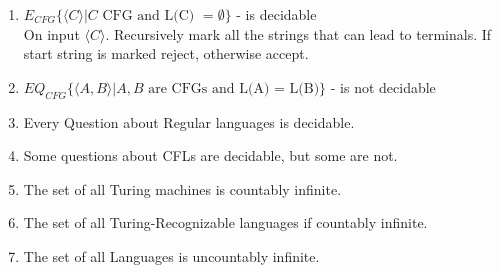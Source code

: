 \documentclass{article}
\newcommand\curl[1]{\{#1\}}
\newcommand\angl[1]{\langle #1 \rangle}}
\begin{document}
\begin{enumerate}[1., leftmargin = 0.5cm]
    \item $E_{CFG} \curl{\langle C \rangle | C \text{ CFG and L(C) } = \emptyset}$  - is decidable\\
        On input $\angl{C}$. Recursively mark all the strings that can lead to terminals. If start string is marked reject, otherwise accept.

    \item $EQ_{CFG}  \curl{\angl{A, B} | A,B \text{ are CFGs and L(A) = L(B)}}$ - is not decidable\\

    \item Every Question about Regular languages is decidable.

    \item Some questions about CFLs are decidable, but some are not.

    \item The set of all Turing machines is countably infinite.

    \item The set of all Turing-Recognizable languages if countably infinite.

    \item The set of all Languages is uncountably infinite.

\end{enumerate}
\end{document}
